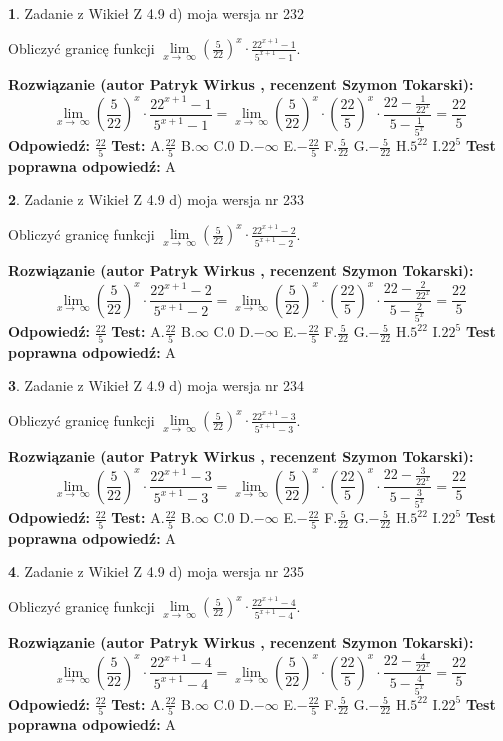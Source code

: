 \documentclass[12pt, a4paper]{article}
\theoremstyle{definition} %
\newtheorem{zad}{}
\newcommand{\zadStart}[1]{\begin{zad}#1\newline}
\newcommand{\zadStop}{\end{zad}}
\newcommand{\rozwStart}[2]{\noindent \textbf{Rozwiązanie (autor #1 , recenzent #2): }\newline}
\newcommand{\rozwStop}{\newline}
\newcommand{\odpStart}{\noindent \textbf{Odpowiedź:}\newline}
\newcommand{\odpStop}{\newline}
\newcommand{\testStart}{\noindent \textbf{Test:}\newline}
\newcommand{\testStop}{\newline}
\newcommand{\kluczStart}{\noindent \textbf{Test poprawna odpowiedź:}\newline}
\newcommand{\kluczStop}{\newline}
\begin{document}
\zadStart{Zadanie z Wikieł Z 4.9 d) moja wersja nr 232}


Obliczyć granicę funkcji  $\lim\limits_{x\to\ \infty}(\frac{5}{22})^{x}\cdot\frac{22^{x+1}-1}{5^{x+1}-1}$.
\zadStop
\rozwStart{Patryk Wirkus}{Szymon Tokarski}
$$\lim\limits_{x\to\ \infty}(\frac{5}{22})^{x}\cdot\frac{22^{x+1}-1}{5^{x+1}-1}=\lim\limits_{x\to\ \infty}(\frac{5}{22})^{x}\cdot(\frac{22}{5})^{x} \cdot \frac{22-\frac{1}{22^{x}}}{5-\frac{1}{5^{x}}} = \frac{22}{5}$$
\rozwStop
\odpStart
$\frac{22}{5}$
\odpStop
\testStart
A.$\frac{22}{5}$ B.$\infty$ C.$0$ D.$-\infty$ E.$-\frac{22}{5}$
F.$\frac{5}{22}$ G.$-\frac{5}{22}$
H.$5^{22}$
I.$22^{5}$
\testStop
\kluczStart
A
\kluczStop



\zadStart{Zadanie z Wikieł Z 4.9 d) moja wersja nr 233}


Obliczyć granicę funkcji  $\lim\limits_{x\to\ \infty}(\frac{5}{22})^{x}\cdot\frac{22^{x+1}-2}{5^{x+1}-2}$.
\zadStop
\rozwStart{Patryk Wirkus}{Szymon Tokarski}
$$\lim\limits_{x\to\ \infty}(\frac{5}{22})^{x}\cdot\frac{22^{x+1}-2}{5^{x+1}-2}=\lim\limits_{x\to\ \infty}(\frac{5}{22})^{x}\cdot(\frac{22}{5})^{x} \cdot \frac{22-\frac{2}{22^{x}}}{5-\frac{2}{5^{x}}} = \frac{22}{5}$$
\rozwStop
\odpStart
$\frac{22}{5}$
\odpStop
\testStart
A.$\frac{22}{5}$ B.$\infty$ C.$0$ D.$-\infty$ E.$-\frac{22}{5}$
F.$\frac{5}{22}$ G.$-\frac{5}{22}$
H.$5^{22}$
I.$22^{5}$
\testStop
\kluczStart
A
\kluczStop



\zadStart{Zadanie z Wikieł Z 4.9 d) moja wersja nr 234}


Obliczyć granicę funkcji  $\lim\limits_{x\to\ \infty}(\frac{5}{22})^{x}\cdot\frac{22^{x+1}-3}{5^{x+1}-3}$.
\zadStop
\rozwStart{Patryk Wirkus}{Szymon Tokarski}
$$\lim\limits_{x\to\ \infty}(\frac{5}{22})^{x}\cdot\frac{22^{x+1}-3}{5^{x+1}-3}=\lim\limits_{x\to\ \infty}(\frac{5}{22})^{x}\cdot(\frac{22}{5})^{x} \cdot \frac{22-\frac{3}{22^{x}}}{5-\frac{3}{5^{x}}} = \frac{22}{5}$$
\rozwStop
\odpStart
$\frac{22}{5}$
\odpStop
\testStart
A.$\frac{22}{5}$ B.$\infty$ C.$0$ D.$-\infty$ E.$-\frac{22}{5}$
F.$\frac{5}{22}$ G.$-\frac{5}{22}$
H.$5^{22}$
I.$22^{5}$
\testStop
\kluczStart
A
\kluczStop



\zadStart{Zadanie z Wikieł Z 4.9 d) moja wersja nr 235}


Obliczyć granicę funkcji  $\lim\limits_{x\to\ \infty}(\frac{5}{22})^{x}\cdot\frac{22^{x+1}-4}{5^{x+1}-4}$.
\zadStop
\rozwStart{Patryk Wirkus}{Szymon Tokarski}
$$\lim\limits_{x\to\ \infty}(\frac{5}{22})^{x}\cdot\frac{22^{x+1}-4}{5^{x+1}-4}=\lim\limits_{x\to\ \infty}(\frac{5}{22})^{x}\cdot(\frac{22}{5})^{x} \cdot \frac{22-\frac{4}{22^{x}}}{5-\frac{4}{5^{x}}} = \frac{22}{5}$$
\rozwStop
\odpStart
$\frac{22}{5}$
\odpStop
\testStart
A.$\frac{22}{5}$ B.$\infty$ C.$0$ D.$-\infty$ E.$-\frac{22}{5}$
F.$\frac{5}{22}$ G.$-\frac{5}{22}$
H.$5^{22}$
I.$22^{5}$
\testStop
\kluczStart
A
\kluczStop
\end{document}
